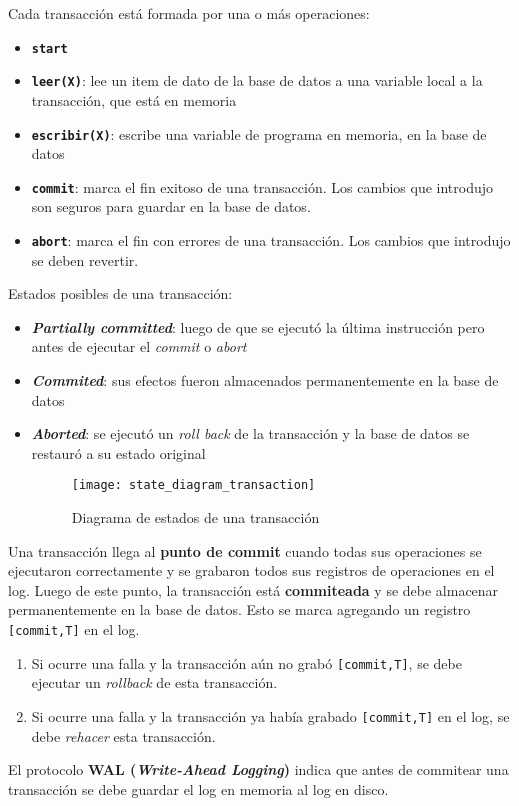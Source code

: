 \documentclass[a4paper, twoside]{article}
\begin{document}
\begin{description}
Cada transacción está formada por una o más operaciones:
\begin{itemize}
\item \texttt{\textbf{start}}
\item \texttt{\textbf{leer(X)}}: lee un item de dato de la base de datos
a una variable local a la transacción, que está en memoria
\item \texttt{\textbf{escribir(X)}}: escribe una variable de programa en
memoria, en la base de datos
\item \texttt{\textbf{commit}}: marca el fin exitoso de una transacción.
Los cambios que introdujo son seguros para guardar en la base de datos.
\item \texttt{\textbf{abort}}: marca el fin con errores de una transacción.
Los cambios que introdujo se deben revertir.
\end{itemize}

Estados posibles de una transacción:
\begin{itemize}
\item \textbf{\emph{Partially committed}}: luego de que se ejecutó la última
instrucción pero antes de ejecutar el \emph{commit} o \emph{abort}
\item \textbf{\emph{Commited}}: sus efectos fueron almacenados permanentemente
en la base de datos
\item \textbf{\emph{Aborted}}: se ejecutó un \emph{roll back} de la transacción
y la base de datos se restauró a su estado original


\begin{figure}[H]
\noindent \begin{centering}
\texttt{[image: state\_diagram\_transaction]}
\par\end{centering}

\protect\caption{Diagrama de estados de una transacción}


\end{figure}


\end{itemize}

Una transacción llega al \textbf{punto de commit} cuando todas sus
operaciones se ejecutaron correctamente y se grabaron todos sus registros
de operaciones en el log. Luego de este punto, la transacción está
\textbf{commiteada} y se debe almacenar permanentemente en la base
de datos. Esto se marca agregando un registro \texttt{{[}commit,T{]}}
en el log.
\begin{enumerate}
\item Si ocurre una falla y la transacción aún no grabó \texttt{{[}commit,T{]}},
se debe ejecutar un \emph{rollback} de esta transacción.
\item Si ocurre una falla y la transacción ya había grabado \texttt{{[}commit,T{]}}
en el log, se debe \emph{rehacer} esta transacción.
\end{enumerate}

El protocolo \textbf{WAL (}\textbf{\emph{Write-Ahead Logging}}\textbf{)}
indica que antes de commitear una transacción se debe guardar el log
en memoria al log en disco.

\end{description}
\end{document}
